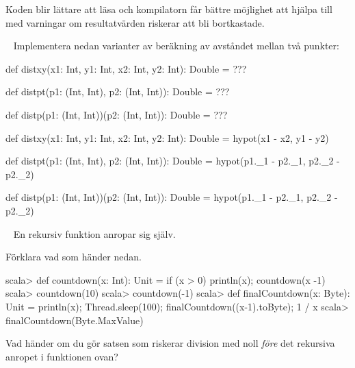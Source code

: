 \SubtaskSolved  Koden blir lättare att läsa och kompilatorn får bättre möjlighet att hjälpa till med varningar om resultatvärden riskerar att bli bortkastade.

\QUESTEND








\QUESTBEGIN

\Task  \what~ Implementera nedan varianter av beräkning av avståndet mellan två punkter:
\begin{Code}
def distxy(x1: Int, y1: Int, x2: Int, y2: Int): Double = ???

def distpt(p1: (Int, Int), p2: (Int, Int)): Double = ???

def distp(p1: (Int, Int))(p2: (Int, Int)): Double = ???

\end{Code}

\SOLUTION

\TaskSolved \what

\begin{Code}
def distxy(x1: Int, y1: Int, x2: Int, y2: Int): Double =
  hypot(x1 - x2, y1 - y2)

def distpt(p1: (Int, Int), p2: (Int, Int)): Double =
  hypot(p1._1 - p2._1, p2._2 - p2._2)

def distp(p1: (Int, Int))(p2: (Int, Int)): Double =
  hypot(p1._1 - p2._1, p2._2 - p2._2)
\end{Code}

\QUESTEND






\QUESTBEGIN

\Task  \what~  En rekursiv funktion anropar sig själv.

\Subtask Förklara vad som händer nedan.

\begin{REPL}
scala> def countdown(x: Int): Unit = if (x > 0) {println(x); countdown(x -1)}
scala> countdown(10)
scala> countdown(-1)
scala> def finalCountdown(x: Byte): Unit =
         {println(x); Thread.sleep(100); finalCountdown((x-1).toByte); 1 / x}
scala> finalCountdown(Byte.MaxValue)
\end{REPL}

\Subtask Vad händer om du gör satsen som riskerar division med noll \emph{före} det rekursiva anropet i funktionen  ovan?

